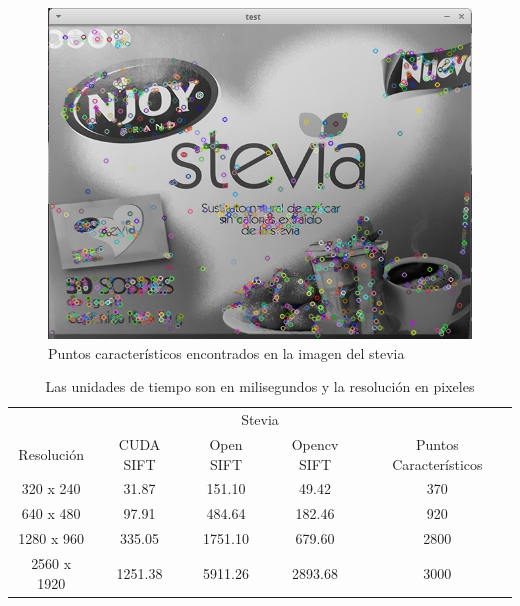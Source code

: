 \begin{figure}[ph]
			\centering
				\includegraphics[scale=0.70]{img/stevia.png}
			\caption{Puntos característicos encontrados en la imagen del stevia}
\end{figure}


\begin{table}[phtb]
\centering
\begin{tabular}{|c|c|c|c|c|}
\hline

\multicolumn{5}{|c|}{Stevia} \\
\cline{1-5}
Resolución & CUDA SIFT & Open SIFT & Opencv SIFT & Puntos Característicos\\
\hline \hline
 320 x 240  & 31.87   &   151.10  &  49.42   & 370\\ \cline{1-5}
 640 x 480  & 97.91   &   484.64  &  182.46  & 920\\ \cline{1-5}
1280 x 960  & 335.05  &  1751.10  &  679.60  & 2800\\ \cline{1-5}
2560 x 1920 & 1251.38 &  5911.26  &  2893.68 & 3000\\ \cline{1-5}

\end{tabular}
\caption{Las unidades de tiempo son en milisegundos y la resolución en pixeles}
\label{tabla:final}
\end{table}


